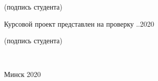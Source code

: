\begin{titlepage}
\begin{center}
\begin{flushright}
\begin{minipage}{0.5\textwidth}
\begin{flushleft}
		  {
		    \centerline{\footnotesize{(подпись студента)}}
	      }

          Курсовой проект представлен на проверку
		  \underline{\hspace*{2em}}.\underline{\hspace*{2em}}.2020\\
		  \underline{\hspace*{8cm}}

		  {
		    \centerline{\footnotesize{(подпись студента)}}
	      }
        \end{flushleft}
      \end{minipage}\\[2.2em]
    \end{flushright}

        \vfill
    {\normalsize Минск 2020}
  \end{center}
\end{titlepage}

